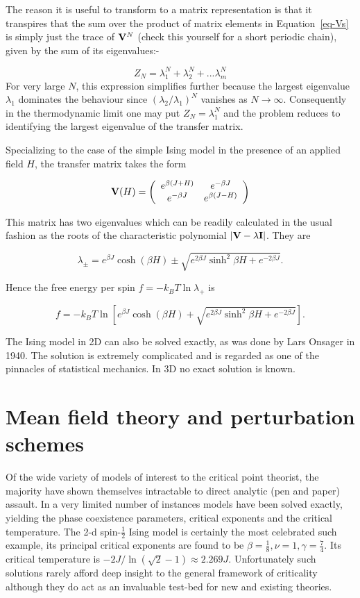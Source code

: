 \documentclass[
  letterpaper,
  enabledeprecatedfontcommands]{report}
\begin{document}
The reason it is useful to transform to a matrix representation is that
it transpires that the sum over the product of matrix elements in
Equation~\ref{eq-Vs} is simply just the trace of \({\bf V}^N\) (check
this yourself for a short periodic chain), given by the sum of its
eigenvalues:-

\[Z_N=\lambda_1^N+\lambda_2^N+...\lambda_m^N\] For very large \(N\),
this expression simplifies further because the largest eigenvalue
\(\lambda_1\) dominates the behaviour since \((\lambda_2/\lambda_1)^N\)
vanishes as \(N\rightarrow \infty\). Consequently in the thermodynamic
limit one may put \(Z_N=\lambda_1^N\) and the problem reduces to
identifying the largest eigenvalue of the transfer matrix.

Specializing to the case of the simple Ising model in the presence of an
applied field \(H\), the transfer matrix takes the form

\[{\bf V}(H)=\left(
\begin{array}{cc}
e^{\beta(J+H)} & e^{-\beta J} \\
e^{-\beta J}   & e^{\beta(J-H)}
\end{array} \right)\]

This matrix has two eigenvalues which can be readily calculated in the
usual fashion as the roots of the characteristic polynomial
\(|{\bf V}-\lambda{\bf I}|\). They are

\[\lambda_{\pm}=e^{\beta J}\cosh(\beta H) \pm \sqrt{e^{2\beta J}\sinh^2\beta H+e^{-2\beta J}}.\]

Hence the free energy per spin \(f=-k_BT\ln \lambda_+\) is

\[f=-k_BT\ln \left[e^{\beta J}\cosh(\beta H) + \sqrt{e^{2\beta J}\sinh^2\beta H+e^{-2\beta J}}\right].\]

The Ising model in 2D can also be solved exactly, as was done by Lars
Onsager in 1940. The solution is extremely complicated and is regarded
as one of the pinnacles of statistical mechanics. In 3D no exact
solution is known.

\chapter{Mean field theory and perturbation
schemes}\label{mean-field-theory-and-perturbation-schemes}

Of the wide variety of models of interest to the critical point
theorist, the majority have shown themselves intractable to direct
analytic (pen and paper) assault. In a very limited number of instances
models have been solved exactly, yielding the phase coexistence
parameters, critical exponents and the critical temperature. The 2-d
spin-\(\frac{1}{2}\) Ising model is certainly the most celebrated such
example, its principal critical exponents are found to be
\(\beta=\frac{1}{8}, \nu=1, \gamma=\frac{7}{4}\). Its critical
temperature is \(-2J/\ln(\sqrt{2}-1)\approx 2.269J\). Unfortunately such
solutions rarely afford deep insight to the general framework of
criticality although they do act as an invaluable test-bed for new and
existing theories.
\end{document}
